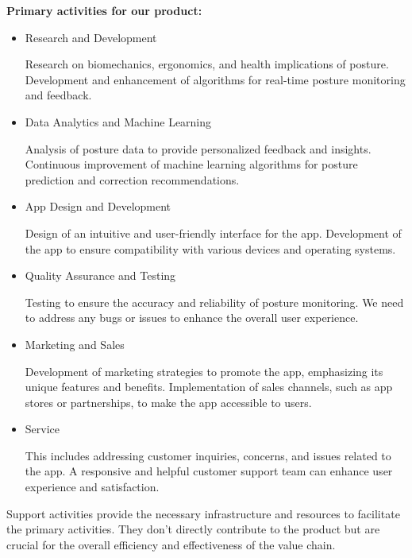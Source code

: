 \textbf{Primary activities for our product:}
\begin{itemize}
    \item Research and Development

    Research on biomechanics, ergonomics, and health implications of posture. Development and enhancement of algorithms for real-time posture monitoring and feedback.
    \item Data Analytics and Machine Learning
    
    Analysis of posture data to provide personalized feedback and insights. Continuous improvement of machine learning algorithms for posture prediction and correction recommendations.
    \item App Design and Development
    
    Design of an intuitive and user-friendly interface for the app. Development of the app to ensure compatibility with various devices and operating systems.
    \item Quality Assurance and Testing
    
    Testing to ensure the accuracy and reliability of posture monitoring. We need to address any bugs or issues to enhance the overall user experience.
    \item Marketing and Sales
    
    Development of marketing strategies to promote the app, emphasizing its unique features and benefits. Implementation of sales channels, such as app stores or partnerships, to make the app accessible to users.
    \item Service
    
    This includes addressing customer inquiries, concerns, and issues related to the app. A responsive and helpful customer support team can enhance user experience and satisfaction.
\end{itemize}

Support activities provide the necessary infrastructure and resources to facilitate the primary activities. They don't directly contribute to the product but are crucial for the overall efficiency and effectiveness of the value chain.\\

